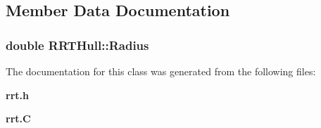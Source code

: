 \subsection{Member Data Documentation}
\subsubsection{\setlength{\rightskip}{0pt plus 5cm}double RRTHull::Radius}\label{classRRTHull_m0}




The documentation for this class was generated from the following files:\begin{CompactItemize}
\item 
{\bf rrt.h}\item 
{\bf rrt.C}\end{CompactItemize}
